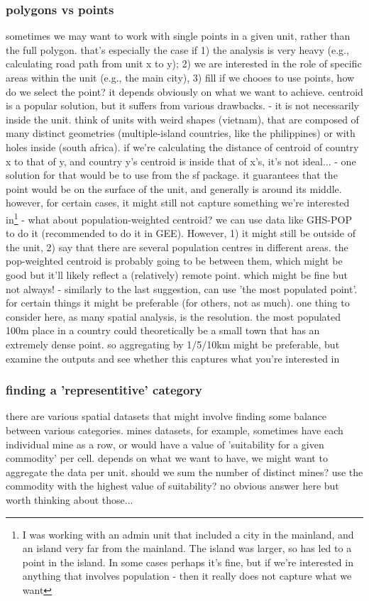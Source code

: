 \subsubsection{polygons vs points}
sometimes we may want to work with single points in a given unit, rather than the full polygon. that's especially the case if 1) the analysis is very heavy (e.g., calculating road path from unit x to y); 2) we are interested in the role of specific areas within the unit (e.g., the main city), 3) fill
if we chooes to use points, how do we select the point? it depends obviously on what we want to achieve.
centroid is a popular solution, but it suffers from various drawbacks. 
- it is not necessarily inside the unit. think of units with weird shapes (vietnam), that are composed of many distinct geometries (multiple-island countries, like the philippines) or with holes inside (south africa). if we're calculating the distance of centroid of country x to that of y, and country y's centroid is inside that of x's, it's not ideal...
- one solution for that would be to use  from the sf package. it guarantees that the point would be on the surface of the unit, and generally is around its middle. however, for certain cases, it might still not capture something we're interested in\footnote{I was working with an admin unit that included a city in the mainland, and an island very far from the mainland. The island was larger, so  has led to a point in the island. In some cases perhaps it's fine, but if we're interested in anything that involves population - then it really does not capture what we want}
- what about population-weighted centroid? we can use data like GHS-POP to do it (recommended to do it in GEE). However, 1) it might still be outside of the unit, 2) say that there are several population centres in different areas. the pop-weighted centroid is probably going to be between them, which might be good but it'll likely reflect a (relatively) remote point. which might be fine but not always!
- similarly to the last suggestion, can use 'the most populated point'. for certain things it might be preferable (for others, not as much). one thing to consider here, as many spatial analysis, is the resolution. the most populated 100m place in a country could theoretically be a small town that has an extremely dense point. so aggregating by 1/5/10km might be preferable, but examine the outputs and see whether this captures what you're interested in

\subsubsection{finding a 'representitive' category}
there are various spatial datasets that might involve finding some balance between various categories. mines datasets, for example, sometimes have each individual mine as a row, or would have a value of 'suitability for a given commodity' per cell. depends on what we want to have, we might want to aggregate the data per unit. should we sum the number of distinct mines? use the commodity with the highest value of suitability? no obvious answer here but worth thinking about those...

